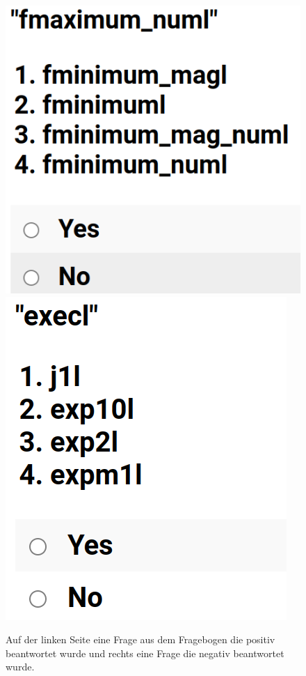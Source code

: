 \documentclass[12pt,letterpaper,ngerman]{article}
\begin{document}
\begin{figure}
  \begin{center}
    \includegraphics[scale=0.3]{abb/survey-example-positive.png}
    \includegraphics[scale=0.3]{abb/survey-example-negative.png}
  \end{center}
  \caption{
    Auf der linken Seite eine Frage aus dem Fragebogen die positiv
    beantwortet wurde und rechts eine Frage die negativ
    beantwortet wurde.
  }
\end{figure}
\end{document}
